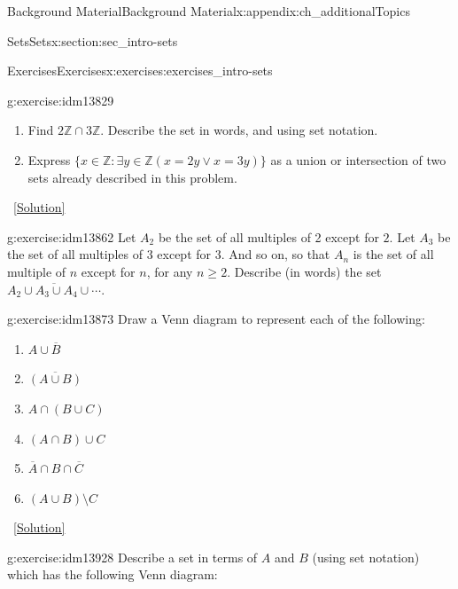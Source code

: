 \documentclass[oneside,10pt,]{book}
\numberwithin{equation}{chapter}
\def\Z{\mathbb Z}
\def\st{:}
\begin{document}
\begin{appendixptx}{Background Material}{}{Background Material}{}{}{x:appendix:ch_additionalTopics}
\begin{sectionptx}{Sets}{}{Sets}{}{}{x:section:sec_intro-sets}
\begin{exercises-subsection}{Exercises}{}{Exercises}{}{}{x:exercises:exercises_intro-sets}
\begin{divisionexercise}{5}{}{}{g:exercise:idm13829}
\begin{enumerate}[label=(\alph*)]
\item{}Find \(2\Z \cap 3\Z\). Describe the set in words, and using set notation.%
\item{}Express \(\{x \in \Z \st \exists y\in \Z (x = 2y \vee x = 3y)\}\) as a union or intersection of two sets already described in this problem.%
\end{enumerate}
%
\qquad~\hfill{\tiny\hyperlink{g:solution:idm13850-main}{[Solution]}}\end{divisionexercise}%
\begin{divisionexercise}{6}{}{}{g:exercise:idm13862}%
Let \(A_2\) be the set of all multiples of 2 except for \(2\). Let \(A_3\) be the set of all multiples of 3 except for 3. And so on, so that \(A_n\) is the set of all multiple of \(n\) except for \(n\), for any \(n \ge 2\). Describe (in words) the set \(\overline{A_2 \cup A_3 \cup A_4 \cup \cdots}\).%
\end{divisionexercise}%
\begin{divisionexercise}{7}{}{}{g:exercise:idm13873}%
Draw a Venn diagram to represent each of the following:%
\begin{enumerate}[label=(\alph*)]
\item{}\(A \cup \overline B\)%
\item{}\(\overline{(A \cup B)}\)%
\item{}\(A \cap (B \cup C)\)%
\item{}\((A \cap B) \cup C\)%
\item{}\(\overline A \cap B \cap \overline C\)%
\item{}\((A \cup B) \setminus C\)%
\end{enumerate}
%
\qquad~\hfill{\tiny\hyperlink{g:solution:idm13889-main}{[Solution]}}\end{divisionexercise}%
\begin{divisionexercise}{8}{}{}{g:exercise:idm13928}%
Describe a set in terms of \(A\) and \(B\) (using set notation) which has the following Venn diagram:%
\begin{sidebyside}{1}{0.4}{0.4}{0}%
\begin{sbspanel}{0.2}%
\end{sbspanel}
\end{sidebyside}
\end{divisionexercise}
\end{exercises-subsection}
\end{sectionptx}
\end{appendixptx}
\end{document}
